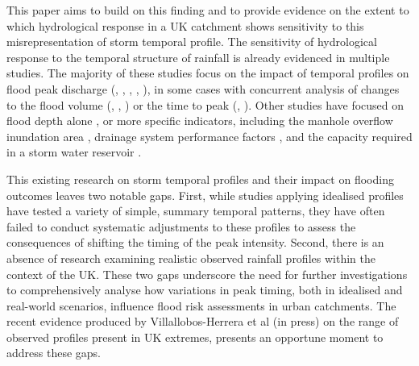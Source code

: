 \documentclass[APA,Times2COL]{WileyNJDv5}
\begin{document}


This paper aims to build on this finding and to provide evidence on the extent to which hydrological response in a UK catchment shows sensitivity to this misrepresentation of storm temporal profile. The sensitivity of hydrological response to the temporal structure of rainfall is already evidenced in multiple studies. The majority of these studies focus on the impact of temporal profiles on flood peak discharge (\citet{fatone2021advanced}, \citet{dullo2017evaluation}, \citet{maca2009influence}, \citet{fadhel2018sensitivity}, \citet{wasko2015steeper}), in some cases with concurrent analysis of changes to the flood volume (\citet{lambourne1987model}, \citet{nguyen2010optimal}, \citet{peyron2002optimal}) or the time to peak (\citet{balbastre2019comparison}, \citet{ball1992influence}). Other studies have focused on flood depth alone \citep{hettiarachchi2018increase}, or more specific indicators, including the manhole overflow inundation area \citep{li2021case}, drainage system performance factors \citep{ng2020design}, and the capacity required in a storm water reservoir  \citep{pochwat2017temporal}. 

This existing research on storm temporal profiles and their impact on flooding outcomes leaves two notable gaps. First, while studies applying idealised profiles have tested a variety of simple, summary temporal patterns, they have often failed to conduct systematic adjustments to these profiles to assess the consequences of shifting the timing of the peak intensity. Second, there is an absence of research examining realistic observed rainfall profiles within the context of the UK. These two gaps underscore the need for further investigations to comprehensively analyse how variations in peak timing, both in idealised and real-world scenarios, influence flood risk assessments in urban catchments. The recent evidence produced by Villallobos-Herrera et al (in press) on the range of observed profiles present in UK extremes, presents an opportune moment to address these gaps. 
\end{document}
